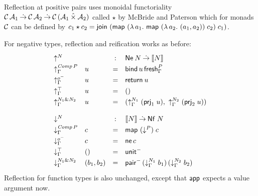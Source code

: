 \documentclass[sigplan,screen,fleqn,review]{acmart} %
\begin{document}
Reflection at positive pairs uses monoidal functoriality
$\mathcal{C}\,\mathcal{A}_1 \mathbin{\dot{\to}} \mathcal{C}\,\mathcal{A}_2 \mathbin{\dot{\to}} \mathcal{C}\,(\mathcal{A}_1 \mathbin{\hat\times} \mathcal{A}_2)$
called $\star$ by McBride and Paterson \cite[Section 7]{mcbridePaterson:applicative}
which for monads $\mathcal{C}$ can be defined by
$c_1 \star c_2 =
   \mathsf{join}^{} \; (\mathsf{map}^{}\;(\lambda\,a_1.\
   \mathsf{map}^{}\;(\lambda\,a_2.\ (a_1,a_2))
    \;c_2)
    \;c_1)$.

For negative types, reflection and reification works as before:
\[
\renewcommand{\left}{}
\renewcommand{\right}{}
\def\arraystretch{1.3}
\begin{array}{llcl} %
  \multicolumn 2 l {\up N} & : & \tNe\,N \todot \den N \\
  \upG {\Comp P} & u & = & \tbind\,u\,\tfresh^P_\Gamma \\
  \upG \natom    & u & = & \treturn\,u \\
  \upG \top      & u & = & \ttempty \\
  \upG {N_1 \ntimes N_2} & u & = & \left(
    \upG {N_1} \; (\prj 1 u)
    ,\
    \upG {N_2} \; (\prj 2 u)
    \right)
\\[2ex]
  \multicolumn 2 l {\down N} & : & \den N \todot \tNf\;N \\
  \downG {\Comp P} & c  & = & \tmap\;(\down P)\;c \\
  \downG \natom    & c  & = & \tne\,c \\
  \downG \top      & () & = & \nunit \\
  \downG {N_1 \ntimes N_2} & (b_1,b_2) & = & \npair
    \, (\downG {N_1} \; b_1)
    \, (\downG {N_2} \; b_2)
    \\
\end{array}
\]
Reflection for function types is also unchanged, except that $\mathsf{app}$
expects a value argument now.
\end{document}
